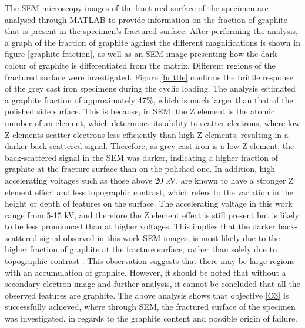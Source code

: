 \documentclass[11pt,a4paper]{article}
\begin{document}
\noindent The SEM microscopy images of the fractured surface of the specimen are analysed through MATLAB to provide information on the fraction of graphite that is present in the specimen's fractured surface. After performing the analysis, a graph of the fraction of graphite against the different magnifications is shown in figure \ref{graphite fraction}, as well as an SEM image presenting how the dark colour of graphite is differentiated from the matrix. Different regions of the fractured surface were investigated. Figure \ref{brittle} confirms the brittle response of the grey cast iron specimens during the cyclic loading. The analysis estimated a graphite fraction of approximately 47\%, which is much larger than that of the polished side surface. This is because, in SEM, the Z element is the atomic number of an element, which determines its ability to scatter electrons, where low Z elements scatter electrons less efficiently than high Z elements, resulting in a darker back-scattered signal. Therefore, as grey cast iron is a low Z element, the back-scattered signal in the SEM was darker, indicating a higher fraction of graphite at the fracture surface than on the polished one. In addition, high accelerating voltages such as those above 20 kV, are known to have a stronger Z element effect and less topographic contrast, which refers to the variation in the height or depth of features on the surface. The accelerating voltage in this work range from 5-15 kV, and therefore the Z element effect is still present but is likely to be less pronounced than at higher voltages. This implies that the darker back-scattered signal observed in this work SEM images, is most likely due to the higher fraction of graphite at the fracture surface, rather than solely due to topographic contrast \cite{article}. This observation suggests that there may be large regions with an accumulation of graphite. However, it should be noted that without a secondary electron image and further analysis, it cannot be concluded that all the observed features are graphite. The above analysis shows that objective \ref{O3} is successfully achieved, where through SEM, the fractured surface of the specimen was investigated, in regards to the graphite content and possible origin of failure. 
\end{document}
